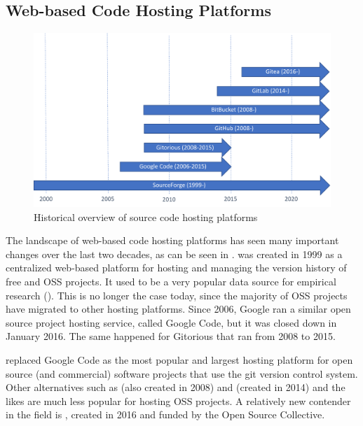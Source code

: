 

\subsection{Web-based Code Hosting Platforms}

\begin{figure}
   \centering
   \includegraphics[width=\textwidth]{codehosting.pdf} %
   \caption{Historical overview of source code hosting platforms}
   \label{INT:fig:codehosting}
\end{figure}

The landscape of web-based code hosting platforms has seen many important changes over the last two decades, as can be seen in .
\sourceforge was created in 1999 as a centralized web-based platform for hosting and managing the version history of free and OSS projects. It used to be a very popular data source for empirical research (\eg \cite{Howison2004,Robles2006, Koch2009,Nyman2011}). This is no longer the case today, since the majority of OSS projects have migrated to other hosting platforms.
Since 2006, Google ran a similar open source project hosting service, called Google Code, but it was closed down in January 2016. The same happened for Gitorious that ran from 2008 to 2015.

\github replaced Google Code as the most popular and largest hosting platform for open source (and commercial) software projects that use the git version control system. Other alternatives such as \bitbucket (also created in 2008) and \gitlab (created in 2014) and the likes are much less popular for hosting OSS projects. A relatively new contender in the field is \gitea, created in 2016 and funded by the Open Source Collective.

